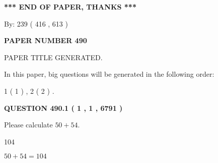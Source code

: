 \documentclass[12pt]{article}
\begin{document}
   
   
   
\vspace{1.0in} 
{\textbf{\large{ *** END OF PAPER, THANKS *** }}} 
   
   
\hspace{1.0in} By: 
 239 ( 416 ,  613 )
   
   
   
   
\newpage 
\setcounter{page}{ 
   490001 } 
   
   
   
   
 {\textbf{ \Large{ PAPER NUMBER  490  }}}
   
   
\vspace{0.2in}
   
   
   
   
   
   
   
   
 \vspace{0.2in}
 
 
 
 
   
   
 PAPER TITLE GENERATED.
   
   
   
\vspace{0.2in}
   
In this paper, big questions will be generated in the following order: 
   
   
   1 ( 1 )
 ,
   2 ( 2 )
 .
  
\vspace{0.2in}
  
{\textbf{\Large{QUESTION
490.1 
 ( 1 , 1 , 6791 )
}}}
  
  
 
Please calculate $ %
50 +  %
54 $.
 
 
 
\noindent{}
 
 

104
 
 
\noindent{}
 
 

 
 
 
\noindent{}
 
 

$ %
50 +  %
54=   %
104$
 
\end{document}
